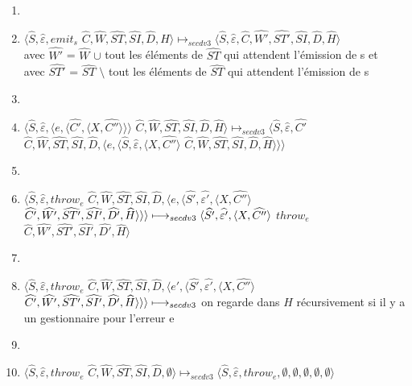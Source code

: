 \documentclass[10pt,a4paper]{article}
\begin{document}
\begin{enumerate}
					\item[]
					\item $\langle\widehat{S},\widehat{\varepsilon},emit_{s}$ $\widehat{C},\widehat{W},\widehat{ST},\widehat{SI},\widehat{D},\widehat{H}\rangle \longmapsto_{secdv3} \langle \widehat{S},\widehat{\varepsilon},\widehat{C},\widehat{W'},\widehat{ST'},\widehat{SI},\widehat{D},\widehat{H}\rangle$\\ avec $\widehat{W'}$ = $\widehat{W}$ $\cup$ tout les éléments de $\widehat{ST}$ qui attendent l'émission de s et\\
					avec $\widehat{ST'}$ = $\widehat{ST}$ $\setminus$ tout les éléments de $\widehat{ST}$ qui attendent l'émission de s
					\item[]
					\item $\langle\widehat{S},\widehat{\varepsilon},\langle e,\langle\widehat{C'},\langle X,\widehat{C''}\rangle\rangle\rangle$ $\widehat{C},\widehat{W},\widehat{ST},\widehat{SI},\widehat{D},\widehat{H}\rangle \longmapsto_{secdv3} \langle\widehat{S},\widehat{\varepsilon},\widehat{C'}$ $\widehat{C},\widehat{W},\widehat{ST},\widehat{SI},\widehat{D},\langle e,\langle\widehat{S},\widehat{\varepsilon},\langle X,\widehat{C''}\rangle$ $\widehat{C},\widehat{W},\widehat{ST},\widehat{SI},\widehat{D},\widehat{H}\rangle\rangle\rangle$
					\item[]
					\item $\langle\widehat{S},\widehat{\varepsilon},throw_{e}$ $\widehat{C},\widehat{W},\widehat{ST},\widehat{SI},\widehat{D},\langle e,\langle\widehat{S'},\widehat{\varepsilon'},\langle X,\widehat{C''}\rangle$ $\widehat{C'},\widehat{W'},\widehat{ST'},\widehat{SI'},\widehat{D'},\widehat{H}\rangle\rangle\rangle 
					\\\longmapsto_{secdv3} \langle\widehat{S'},\widehat{\varepsilon'},\langle X,\widehat{C''}\rangle$ $throw_{e}$ $\widehat{C},\widehat{W'},\widehat{ST'},\widehat{SI'},\widehat{D'},\widehat{H}\rangle$
					\item[]
					\item $\langle\widehat{S},\widehat{\varepsilon},throw_{e}$ $\widehat{C},\widehat{W},\widehat{ST},\widehat{SI},\widehat{D},\langle e',\langle\widehat{S'},\widehat{\varepsilon'},\langle X,\widehat{C''}\rangle$ $\widehat{C'},\widehat{W'},\widehat{ST'},\widehat{SI'},\widehat{D'},\widehat{H}\rangle\rangle\rangle 
					\\\longmapsto_{secdv3}$ on regarde dans $\widehat{H}$ récursivement si il y a un gestionnaire pour l'erreur e
					\item[]
					\item $\langle\widehat{S},\widehat{\varepsilon},throw_{e}$ $\widehat{C},\widehat{W},\widehat{ST},\widehat{SI},\widehat{D},\emptyset\rangle \longmapsto_{secdv3} \langle\widehat{S},\widehat{\varepsilon},throw_{e},\emptyset,\emptyset,\emptyset,\emptyset,\emptyset\rangle$  
				\end{enumerate}
				\bigbreak
				\bigbreak
				
\end{document}
